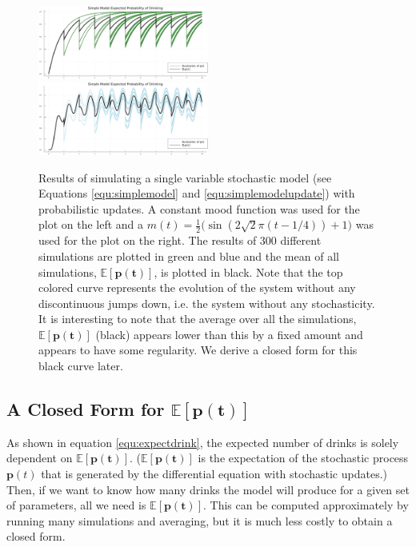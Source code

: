 \documentclass{journal}
\theoremstyle{definition}
\begin{document}
\begin{figure}[h] \label{fig:simple_expected_p}
\includegraphics[width=0.5\textwidth]{simple_expected_p.png}
\includegraphics[width=0.5\textwidth]{simple_expected_p_sin.png}
\caption{Results of simulating a single variable stochastic model (see Equations \ref{equ:simplemodel} and \ref{equ:simplemodelupdate}) with probabilistic updates. A constant mood function was used for the plot on the left and a $m(t) = \frac{1}{2}\big(\sin(2\sqrt{2}\pi (t - 1/4)) + 1\big)$ was used for the plot on the right. The results of 300 different simulations are plotted in green and blue and the mean of all simulations, $\mathbb{E}[\mathbf{p(t)}]$, is plotted in black. Note that the top colored curve represents the evolution of the system without any discontinuous jumps down, i.e. the system without any stochasticity. It is interesting to note that the average over all the simulations, $\mathbb{E}[\mathbf{p(t)}]$ (black) appears lower than this by a fixed amount and appears to have some regularity. We derive a closed form for this black curve later.}
\end{figure}

\subsection{A Closed Form for $\mathbb{E}[\mathbf{p(t)}]$}

As shown in equation \ref{equ:expectdrink}, the expected number of drinks is solely dependent on $\mathbb{E}[\mathbf{p(t)}]$. ($\mathbb{E}[\mathbf{p(t)}]$ is the expectation of the stochastic process $\mathbf{p}(t)$ that is generated by the differential equation with stochastic updates.) Then, if we want to know how many drinks the model will produce for a given set of parameters, all we need is $\mathbb{E}[\mathbf{p(t)}]$. This can be computed approximately by running many simulations and averaging, but it is much less costly to obtain a closed form.
\end{document}
